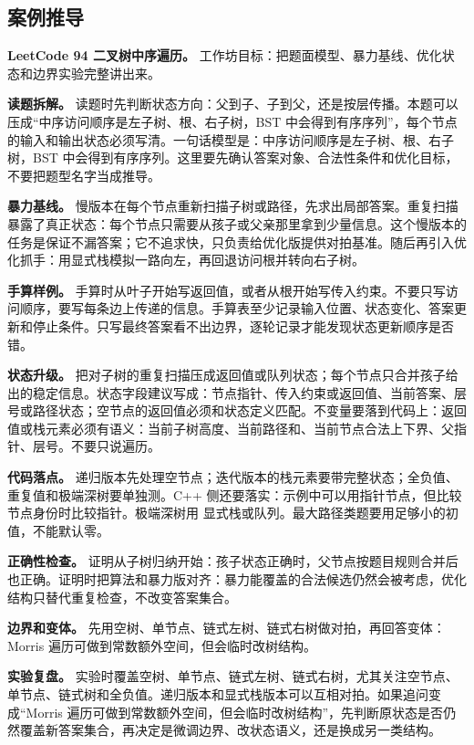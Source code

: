 \subsection{案例推导}

\noindent\textbf{LeetCode 94 二叉树中序遍历。} 工作坊目标：把题面模型、暴力基线、优化状态和边界实验完整讲出来。

\textbf{读题拆解。} 读题时先判断状态方向：父到子、子到父，还是按层传播。本题可以压成“中序访问顺序是左子树、根、右子树，BST 中会得到有序序列”，每个节点的输入和输出状态必须写清。一句话模型是：中序访问顺序是左子树、根、右子树，BST 中会得到有序序列。这里要先确认答案对象、合法性条件和优化目标，不要把题型名字当成推导。

\textbf{暴力基线。} 慢版本在每个节点重新扫描子树或路径，先求出局部答案。重复扫描暴露了真正状态：每个节点只需要从孩子或父亲那里拿到少量信息。这个慢版本的任务是保证不漏答案；它不追求快，只负责给优化版提供对拍基准。随后再引入优化抓手：用显式栈模拟一路向左，再回退访问根并转向右子树。

\textbf{手算样例。} 手算时从叶子开始写返回值，或者从根开始写传入约束。不要只写访问顺序，要写每条边上传递的信息。手算表至少记录输入位置、状态变化、答案更新和停止条件。只写最终答案看不出边界，逐轮记录才能发现状态更新顺序是否错。

\textbf{状态升级。} 把对子树的重复扫描压成返回值或队列状态；每个节点只合并孩子给出的稳定信息。状态字段建议写成：节点指针、传入约束或返回值、当前答案、层号或路径状态；空节点的返回值必须和状态定义匹配。不变量要落到代码上：返回值或栈元素必须有语义：当前子树高度、当前路径和、当前节点合法上下界、父指针、层号。不要只说遍历。

\textbf{代码落点。} 递归版本先处理空节点；迭代版本的栈元素要带完整状态；全负值、重复值和极端深树要单独测。C++ 侧还要落实：示例中可以用指针节点，但比较节点身份时比较指针。极端深树用  显式栈或队列。最大路径类题要用足够小的初值，不能默认零。

\textbf{正确性检查。} 证明从子树归纳开始：孩子状态正确时，父节点按题目规则合并后也正确。证明时把算法和暴力版对齐：暴力能覆盖的合法候选仍然会被考虑，优化结构只替代重复检查，不改变答案集合。

\textbf{边界和变体。} 先用空树、单节点、链式左树、链式右树做对拍，再回答变体：Morris 遍历可做到常数额外空间，但会临时改树结构。

\textbf{实验复盘。} 实验时覆盖空树、单节点、链式左树、链式右树，尤其关注空节点、单节点、链式树和全负值。递归版本和显式栈版本可以互相对拍。如果追问变成“Morris 遍历可做到常数额外空间，但会临时改树结构”，先判断原状态是否仍然覆盖新答案集合，再决定是微调边界、改状态语义，还是换成另一类结构。


